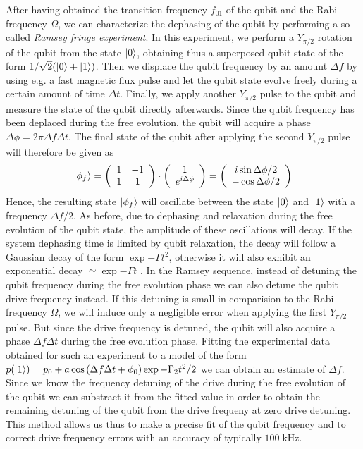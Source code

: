 After having obtained the transition frequency $f_{01}$ of the qubit and the Rabi frequency $\Omega$, we can characterize the dephasing of the qubit by performing a so-called {\it Ramsey fringe experiment}\citep{}. In this experiment, we perform a $Y_{\pi/2}$ rotation of the qubit from the state $\left| 0 \right>$, obtaining thus a superposed qubit state of the form $1/\sqrt{2}(\left| 0 \right>+\left| 1 \right>)$. Then we displace the qubit frequency by an amount $\Delta f$ by using e.g. a fast magnetic flux pulse and let the qubit state evolve freely during a certain amount of time $\Delta t$. Finally, we apply another $Y_{\pi/2}$ pulse to the qubit and measure the state of the qubit directly afterwards. Since the qubit frequency has been deplaced during the free evolution, the qubit will acquire a phase $\Delta \phi = 2\pi\Delta f \Delta t$. The final state of the qubit after applying the second $Y_{\pi/2}$ pulse will therefore be given as
%
\begin{equation}
\left| \phi_f \right> = \left(\begin{array}{cc} 1 & -1 \\ 1 & 1 \end{array} \right)\cdot\left(\begin{array}{c} 1 \\ e^{i\Delta\phi} \end{array}\right) = \left( \begin{array}{c} i\sin{\Delta\phi/2} \\ -\cos{\Delta\phi/2}\end{array}\right)
\end{equation}
%
Hence, the resulting state $\left| \phi_f \right>$ will oscillate between the state $\left| 0 \right>$ and $\left| 1 \right>$ with a frequency $\Delta f/2$. As before, due to dephasing and relaxation during the free evolution of the qubit state, the amplitude of these oscillations will decay. If the system dephasing time is limited by qubit relaxation, the decay will follow a Gaussian decay of the form $\exp{-\Gamma t^2}$, otherwise it will also exhibit an exponential decay $\simeq \exp{-\Gamma t}$ \citep{}. In the Ramsey sequence, instead of detuning the qubit frequency during the free evolution phase we can also detune the qubit drive frequency instead. If this detuning is small in comparision to the Rabi frequency $\Omega$, we will induce only a negligible error when applying the first $Y_{\pi/2}$ pulse. But since the drive frequency is detuned, the qubit will also acquire a phase $\Delta f \Delta t$ during the free evolution phase. Fitting the experimental data obtained for such an experiment to a model of the form $p(\left| 1 \right>) = p_0 +a\cos{(\Delta f \Delta t+\phi_0)}\exp{-\Gamma_2 t^2/2}$ we can obtain an estimate of $\Delta f$. Since we know the frequency detuning of the drive during the free evolution of the qubit we can substract it from the fitted value in order to obtain the remaining detuning of the qubit from the drive frequeny at zero drive detuning. This method allows us thus to make a precise fit of the qubit frequency and to correct drive frequency errors with an accuracy of typically $100\;\mathrm{kHz}$. 

